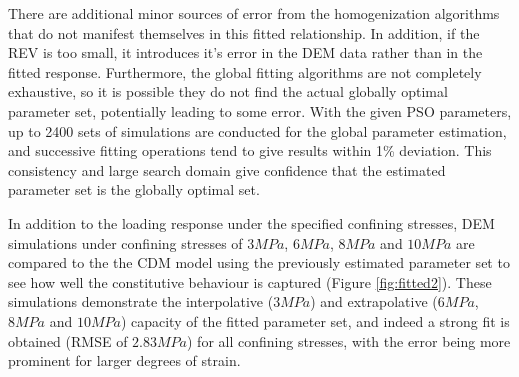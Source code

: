There are additional minor sources of error from the homogenization algorithms that do not manifest themselves in this fitted relationship.  In addition, if the REV is too small, it introduces it's error in the DEM data rather than in the fitted response. Furthermore, the global fitting algorithms are not completely exhaustive, so it is possible they do not find the actual globally optimal parameter set, potentially leading to some error. With the given PSO parameters, up to 2400 sets of simulations are conducted for the global parameter estimation, and successive fitting operations tend to give results within 1\% deviation. This consistency and large search domain give confidence that the estimated parameter set is the globally optimal set. 

In addition to the loading response under the specified confining stresses, DEM simulations under confining stresses of $3MPa$, $6MPa$, $8MPa$ and $10MPa$ are compared to the the CDM model using the previously estimated parameter set to see how well the constitutive behaviour is captured (Figure \ref{fig:fitted2}). These simulations demonstrate the interpolative ($3MPa$) and extrapolative ($6MPa$, $8MPa$ and $10MPa$) capacity of the fitted parameter set, and indeed a strong fit is obtained (RMSE of $2.83MPa$) for all confining stresses, with the error being more prominent for larger degrees of strain.